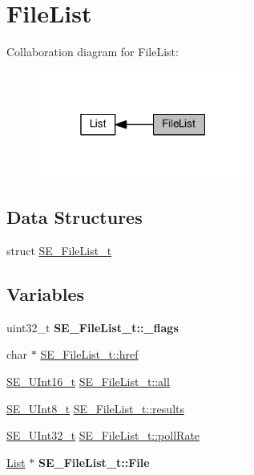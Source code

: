 \hypertarget{group__FileList}{}\section{File\+List}
\label{group__FileList}
Collaboration diagram for File\+List\+:\nopagebreak
\begin{figure}[H]
\begin{center}
\leavevmode
\includegraphics[width=196pt]{group__FileList}
\end{center}
\end{figure}
\subsection*{Data Structures}
\begin{DoxyCompactItemize}
\item 
struct \hyperlink{structSE__FileList__t}{S\+E\+\_\+\+File\+List\+\_\+t}
\end{DoxyCompactItemize}
\subsection*{Variables}
\begin{DoxyCompactItemize}
\item 
\mbox{\label{group__FileList_ga7357c2a222fb588fdfaa857ec6707474}} 
uint32\+\_\+t {\bfseries S\+E\+\_\+\+File\+List\+\_\+t\+::\+\_\+flags}
\item 
char $\ast$ \hyperlink{group__FileList_ga7ddecb44b6b65daa5a5324c09a396853}{S\+E\+\_\+\+File\+List\+\_\+t\+::href}
\item 
\hyperlink{group__UInt16_gac68d541f189538bfd30cfaa712d20d29}{S\+E\+\_\+\+U\+Int16\+\_\+t} \hyperlink{group__FileList_ga3c96b7591e75f2ba60753bd7e7b706e5}{S\+E\+\_\+\+File\+List\+\_\+t\+::all}
\item 
\hyperlink{group__UInt8_gaf7c365a1acfe204e3a67c16ed44572f5}{S\+E\+\_\+\+U\+Int8\+\_\+t} \hyperlink{group__FileList_gaac837f0b9ccb09e669a79138ff5fc4b4}{S\+E\+\_\+\+File\+List\+\_\+t\+::results}
\item 
\hyperlink{group__UInt32_ga70bd4ecda3c0c85d20779d685a270cdb}{S\+E\+\_\+\+U\+Int32\+\_\+t} \hyperlink{group__FileList_ga27aa967b9be8765b2407b51ba6e3e65e}{S\+E\+\_\+\+File\+List\+\_\+t\+::poll\+Rate}
\item 
\mbox{\label{group__FileList_ga6f1ae4ad3352f5b763c2631a04d52685}} 
\hyperlink{structList}{List} $\ast$ {\bfseries S\+E\+\_\+\+File\+List\+\_\+t\+::\+File}
\end{DoxyCompactItemize}



